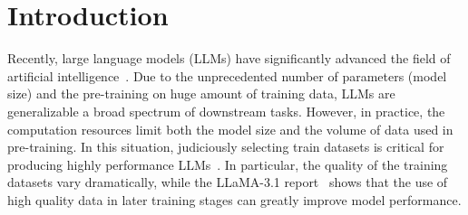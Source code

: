 \documentclass{article} %
\begin{document}



\section{Introduction}
Recently, large language models (LLMs) have significantly advanced the field of artificial intelligence~\citep{zhao2023survey, hadi2023survey, minaee2024large}. Due to the unprecedented number of parameters (model size) and the pre-training on huge amount of training data, LLMs are generalizable a broad spectrum of downstream tasks.
However, in practice, the computation resources limit both the model size and the volume of data used in pre-training.  In this situation, judiciously selecting train datasets is critical for producing highly performance LLMs~\citep{brown2020language, du2022glam, gururangan2020don, hoffmann2022empirical, raffel2020exploring}. In particular, the quality of the training datasets vary dramatically, while the LLaMA-3.1 report~\citep{dubey2024llama} shows that the use of high quality data in later training stages can greatly improve model performance.


\end{document}
